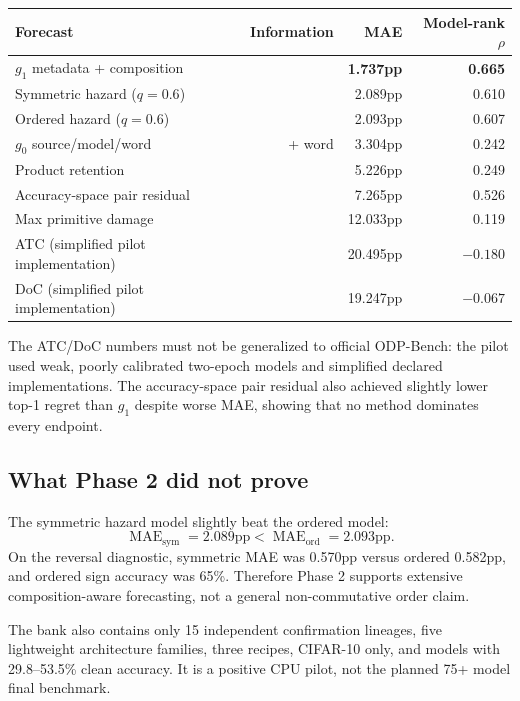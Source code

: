 \documentclass[11pt,a4paper]{article}
\newcommand{\MAE}{\operatorname{MAE}}
\newcommand{\Rzero}{\mathrm{R0}}
\newcommand{\Rone}{\mathrm{R1}}
\newcommand{\Rtwo}{\mathrm{R2}}
\newcommand{\Rthree}{\mathrm{R3}}
\begin{document}
\begin{center}
\begin{tabular}{lrrr}
\toprule
\textbf{Forecast} & \textbf{Information} & \textbf{MAE} & \textbf{Model-rank $\rho$}\\
\midrule
$g_1$ metadata + composition & \Rtwo{} & \textbf{1.737pp} & \textbf{0.665}\\
Symmetric hazard ($q=0.6$) & \Rtwo{} & 2.089pp & 0.610\\
Ordered hazard ($q=0.6$) & \Rtwo{} & 2.093pp & 0.607\\
$g_0$ source/model/word & \Rzero{} + word & 3.304pp & 0.242\\
Product retention & \Rone{} & 5.226pp & 0.249\\
Accuracy-space pair residual & \Rtwo{} & 7.265pp & 0.526\\
Max primitive damage & \Rone{} & 12.033pp & 0.119\\
ATC (simplified pilot implementation) & \Rthree{} & 20.495pp & $-0.180$\\
DoC (simplified pilot implementation) & \Rthree{} & 19.247pp & $-0.067$\\
\bottomrule
\end{tabular}
\end{center}

The ATC/DoC numbers must not be generalized to official ODP-Bench: the pilot
used weak, poorly calibrated two-epoch models and simplified declared
implementations.  The accuracy-space pair residual also achieved slightly
lower top-1 regret than $g_1$ despite worse MAE, showing that no method dominates
every endpoint.

\subsection{What Phase 2 did not prove}

The symmetric hazard model slightly beat the ordered model:
\[
\MAE_{\mathrm{sym}}=2.089\text{pp}
<\MAE_{\mathrm{ord}}=2.093\text{pp}.
\]
On the reversal diagnostic, symmetric MAE was 0.570pp versus ordered 0.582pp,
and ordered sign accuracy was 65\%.  Therefore Phase 2 supports extensive
composition-aware forecasting, not a general non-commutative order claim.

The bank also contains only 15 independent confirmation lineages, five
lightweight architecture families, three recipes, CIFAR-10 only, and models
with 29.8--53.5\% clean accuracy.  It is a positive CPU pilot, not the planned
75+ model final benchmark.
\end{document}

